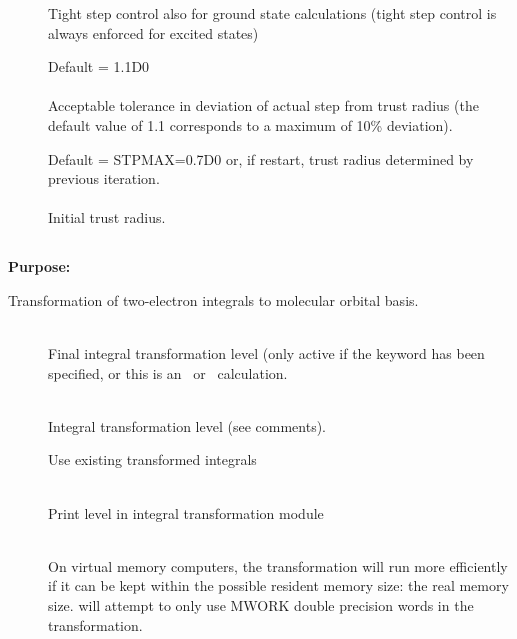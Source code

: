 \begin{description}
\item[]
  Tight step control also for ground state calculations
  (tight step control is always enforced for excited states)

\item[]
  Default = 1.1D0\\
   \\
  Acceptable tolerance in deviation of actual step from trust radius
  (the default value of 1.1 corresponds to a maximum of 10\% deviation).

\item[]
  Default = STPMAX=0.7D0 or, if restart, trust radius determined by previous
            iteration.\\
   \\
  Initial trust radius.

\end{description}


\pagebreak[3]
\subsection{\label{ref-trainp}}

{\bf Purpose:}

Transformation of two-electron
integrals to molecular orbital
basis.

\begin{description}
\item[]
   \\
  Final integral transformation level (only active if the keyword
   has been specified, or this is an \aba\ or
  \resp\ calculation.

\item[]
   \\
  Integral transformation level (see comments).

\item[]
  Use existing transformed integrals

\item[]
   \\
  Print level in integral transformation module

\item[]
   \\
  On virtual memory computers, the transformation will run more
  efficiently if it can be kept within the possible resident memory
  size: the real memory size.  {\sir} will attempt to only use MWORK
  double precision words in the transformation.
\end{description}


